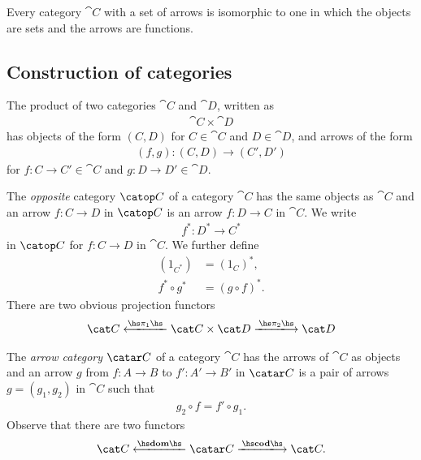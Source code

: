 \documentclass{article}
\begin{document}
\begin{theorem}
    Every category $\cat{C}$ with a set of arrows is isomorphic
    to one in which the objects are sets and the arrows are functions.
\end{theorem}

\subsection{Construction of categories}

\begin{definition*}
    The product of two categories $\cat{C}$ and $\cat{D}$, written
    as
    \begin{align*}
        \cat{C}\times\cat{D}
    \end{align*} 
    has objects of the form $(C,D)$ for $C\in\cat{C}$ and $D\in\cat{D}$,
    and arrows of the form
    \begin{align*}
        (f,g):(C,D)\to (C',D')
    \end{align*}
    for $f:C\to C'\in\cat{C}$ and $g:D\to D'\in\cat{D}$.
\end{definition*}

\begin{definition*}
    The \emph{opposite} category $\catop C$ of a category $\cat C$ has
    the same objects as $\cat C$ and an arrow $f:C\to D$ in $\catop C$
    is an arrow $f:D\to C$ in $\cat C$. We write
    \begin{align*}
        f^* : D^* \to C^*
    \end{align*} 
    in $\catop C$ for $f:C\to D$ in $\cat C$. We further define
    \begin{align*}
         (1_{C^*}) &= (1_C)^*,\\ 
         f^*\circ g^*&= (g\circ f)^*.
    \end{align*}
    There are two obvious projection functors
    \begin{align*}
        \cat C \xlongleftarrow{\hs\pi_1\hs} \cat C\times \cat D \xlongrightarrow{\hs\pi_2\hs} \cat D
    \end{align*}
\end{definition*}

\begin{definition*}
    The \emph{arrow category} $\catar C$ of a category $\cat C$
    has the arrows of $\cat C$ as objects and an arrow $g$ from
    $f:A\to B$ to $f':A'\to B'$ in $\catar C$ is a pair of arrows
    $g=(g_1, g_2)$ in $\cat C$ such that 
    \begin{align*}
        g_2\circ f = f'\circ g_1.
    \end{align*}
    Observe that there are two functors
    \begin{align*}
        \cat C \xlongleftarrow{\hs\textbf{dom}\hs} \catar C \xlongrightarrow{\hs\textbf{cod}\hs} \cat C.
    \end{align*}
\end{definition*}
\end{document}

